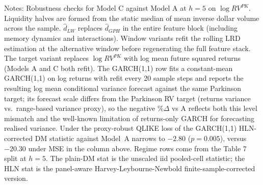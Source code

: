 
\begin{table}[htbp]
\centering
\caption{Robustness Summary: Model C vs Model A, $h=5$}
\label{tab:robustness}
\small
{}
\begin{tablenotes}\small
\item Notes: Robustness checks for Model C against Model A at $h=5$ on $\log RV^{PK}$. Liquidity halves are formed from the static median of mean inverse dollar volume across the sample. $\hat d_{LW}$ replaces $\hat d_{GPH}$ in the entire feature block (including memory dynamics and interactions). Window variants refit the rolling LRD estimation at the alternative window before regenerating the full feature stack. The target variant replaces $\log RV^{PK}$ with log mean future squared returns (Models A and C both refit). The GARCH(1,1) row fits a constant-mean GARCH(1,1) on log returns with refit every 20 sample steps and reports the resulting log mean conditional variance forecast against the same Parkinson target; its forecast scale differs from the Parkinson RV target (returns variance vs.\ range-based variance proxy), so the negative $\%\Delta$ vs A reflects both this level mismatch and the well-known limitation of returns-only GARCH for forecasting realised variance. Under the proxy-robust QLIKE loss of \citet{patton2011volatility} the GARCH(1,1) HLN-corrected DM statistic against Model~A narrows to $-2.80$ ($p=0.005$), versus $-20.30$ under MSE in the column above. Regime rows come from the Table 7 split at $h=5$. The plain-DM stat is the unscaled iid pooled-cell statistic; the HLN stat is the panel-aware Harvey-Leybourne-Newbold finite-sample-corrected version.
\end{tablenotes}
\end{table}